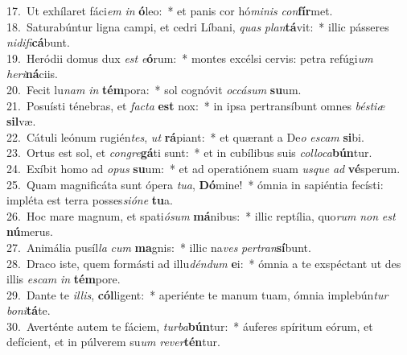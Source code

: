 {17.~}Ut exhílaret fáci\textit{em} \textit{in} \textbf{ó}leo:~* et panis cor hó\textit{mi}\textit{nis} \textit{con}\textbf{fír}met.\\
{18.~}Saturabúntur ligna campi, et cedri Líbani, \textit{quas} \textit{plan}\textbf{tá}vit:~* illic pásseres \textit{ni}\textit{di}\textit{fi}\textbf{cá}bunt.\\
{19.~}Heródii domus dux \textit{est} \textit{e}\textbf{ó}rum:~* montes excélsi cervis: petra refúgi\textit{um} \textit{he}\textit{ri}\textbf{ná}ciis.\\
{20.~}Fecit lu\textit{nam} \textit{in} \textbf{tém}pora:~* sol cognóvit \textit{oc}\textit{cá}\textit{sum} \textbf{su}um.\\
{21.~}Posuísti ténebras, et \textit{fa}\textit{cta} \textbf{est} nox:~* in ipsa pertransíbunt omnes \textit{bé}\textit{sti}\textit{æ} \textbf{sil}væ.\\
{22.~}Cátuli leónum rugién\textit{tes}, \textit{ut} \textbf{rá}piant:~* et quærant a De\textit{o} \textit{e}\textit{scam} \textbf{si}bi.\\
{23.~}Ortus est sol, et \textit{con}\textit{gre}\textbf{gá}ti sunt:~* et in cubílibus suis \textit{col}\textit{lo}\textit{ca}\textbf{bún}tur.\\
{24.~}Exíbit homo ad \textit{o}\textit{pus} \textbf{su}um:~* et ad operatiónem suam \textit{us}\textit{que} \textit{ad} \textbf{vé}sperum.\\
{25.~}Quam magnificáta sunt ópera \textit{tu}\textit{a}, \textbf{Dó}mine!~* ómnia in sapiéntia fecísti: impléta est terra posses\textit{si}\textit{ó}\textit{ne} \textbf{tu}a.\\
{26.~}Hoc mare magnum, et spati\textit{ó}\textit{sum} \textbf{má}nibus:~* illic reptília, quo\textit{rum} \textit{non} \textit{est} \textbf{nú}merus.\\
{27.~}Animália pusíl\textit{la} \textit{cum} \textbf{ma}gnis:~* illic na\textit{ves} \textit{per}\textit{tran}\textbf{sí}bunt.\\
{28.~}Draco iste, quem formásti ad illu\textit{dén}\textit{dum} \textbf{e}i:~* ómnia a te exspéctant ut des illis \textit{e}\textit{scam} \textit{in} \textbf{tém}pore.\\
{29.~}Dante te \textit{il}\textit{lis}, \textbf{cól}ligent:~* aperiénte te manum tuam, ómnia implebún\textit{tur} \textit{bo}\textit{ni}\textbf{tá}te.\\
{30.~}Averténte autem te fáciem, \textit{tur}\textit{ba}\textbf{bún}tur:~* áuferes spíritum eórum, et defícient, et in púlverem su\textit{um} \textit{re}\textit{ver}\textbf{tén}tur.\\

